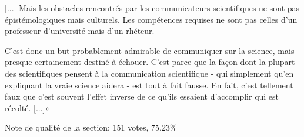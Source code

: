 	[...] Mais les obstacles rencontrés par les communicateurs scientifiques ne sont pas épistémologiques mais culturels. Les compétences requises ne sont pas celles d'un professeur d'université mais d'un rhéteur.

	C'est donc un but probablement admirable de communiquer sur la science, mais presque certainement destiné à échouer. C'est parce que la façon dont la plupart des scientifiques pensent à la communication scientifique - qui simplement qu'en expliquant la vraie science aidera - est tout à fait fausse. En fait, c'est tellement faux que c'est souvent l'effet inverse de ce qu'ils essaient d'accomplir qui est récolté. [...]»
	
	\begin{flushright}
	Note de qualité de la section:  151 votes, 75.23\%
	\end{flushright}